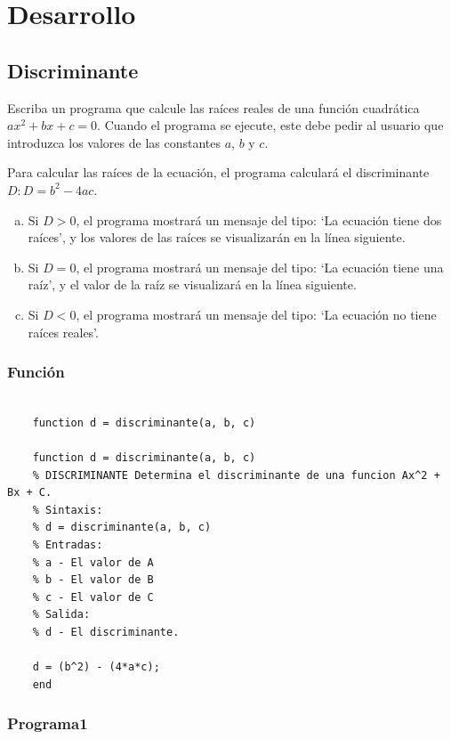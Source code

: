 \documentclass{article}
\begin{document}
	\newpage
	\section{Desarrollo}
	
	\subsection{Discriminante}
	
	Escriba un programa que calcule las raíces reales de una función cuadrática $ax^2+bx+c = 0$. Cuando el programa se ejecute, este debe pedir al usuario que introduzca los valores de las constantes $a$, $b$ y $c$.
	\newline
	
	Para calcular las raíces de la ecuación, el programa calculará el discriminante $D: D=b^2-4ac$.
	
	\begin{enumerate}[a)]
		\item Si $D > 0$, el programa mostrará un mensaje del tipo: ‘La ecuación tiene dos raíces’, y los valores de las raíces se visualizarán en la línea siguiente.
		
		\item Si $D = 0$, el programa mostrará un mensaje del tipo: ‘La ecuación tiene una raíz’, y el valor de la raíz se visualizará en la línea siguiente.
		
		\item Si $D < 0$, el programa mostrará un mensaje del tipo: ‘La ecuación no tiene raíces reales’.
	\end{enumerate}
	
	\subsubsection{Función}
	
	\begin{lstlisting}
	
	function d = discriminante(a, b, c)
	
	function d = discriminante(a, b, c)
	% DISCRIMINANTE Determina el discriminante de una funcion Ax^2 + Bx + C.
	% Sintaxis:
	% d = discriminante(a, b, c)
	% Entradas:
	% a - El valor de A
	% b - El valor de B
	% c - El valor de C
	% Salida:
	% d - El discriminante.
	
	d = (b^2) - (4*a*c);
	end
	\end{lstlisting}
	
	\subsubsection{Programa1}
	
\end{document}
